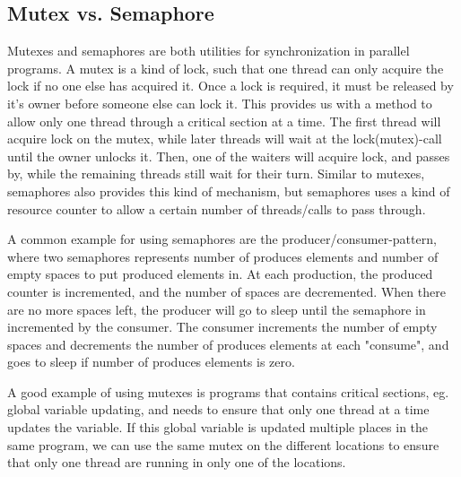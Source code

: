 \documentclass[english,a4paper,numbers=noenddot]{article}
\begin{document}
\subsection{Mutex vs. Semaphore}
Mutexes and semaphores are both utilities for synchronization in parallel programs. A mutex is a kind of lock, such that one thread can only acquire the lock if no one else has acquired it. Once a lock is required, it must be released by it's owner before someone else can lock it. This provides us with a method to allow only one thread through a critical section at a time. The first thread will acquire lock on the mutex, while later threads will wait at the lock(mutex)-call until the owner unlocks it. Then, one of the waiters will acquire lock, and passes by, while the remaining threads still wait for their turn. Similar to mutexes, semaphores also provides this kind of mechanism, but semaphores uses a kind of resource counter to allow a certain number of threads/calls to pass through.

A common example for using semaphores are the producer/consumer-pattern, where two semaphores represents number of produces elements and number of empty spaces to put produced elements in. At each production, the produced counter is incremented, and the number of spaces are decremented. When there are no more spaces left, the producer will go to sleep until the semaphore in incremented by the consumer. The consumer increments the number of empty spaces and decrements the number of produces elements at each "consume", and goes to sleep if number of produces elements is zero.

A good example of using mutexes is programs that contains critical sections, eg. global variable updating, and needs to ensure that only one thread at a time updates the variable. If this global variable is updated multiple places in the same program, we can use the same mutex on the different locations to ensure that only one thread are running in only one of the locations.
\end{document}
